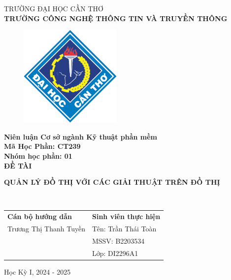 \begin{titlepage}
  \begin{center}
    \vspace{-6pt}TRƯỜNG ĐẠI HỌC CẦN THƠ \\
    \textbf{\fontsize{16pt}{0pt}\selectfont TRƯỜNG CÔNG NGHỆ THÔNG TIN VÀ TRUYỀN THÔNG}
    \begin{figure}[H]
      \centering
      \includegraphics[width=5cm]{assets/imgs/logo-ctu.png}
    \end{figure}
    \textbf{Niên luận Cơ sở ngành Kỹ thuật phần mềm} \\
    \textbf{Mã Học Phần: CT239} \\
    \textbf{Nhóm học phần: 01} \\
    \vspace{3cm}
    \textbf{\fontsize{16pt}{0pt}\selectfont ĐỀ TÀI} \\
    \vspace{0.5cm}
    \parbox{15cm}{\centering\textbf{\fontsize{14pt}{0pt}\selectfont QUẢN LÝ ĐỒ THỊ VỚI CÁC GIẢI THUẬT TRÊN ĐỒ THỊ  }} \\
    \vspace{3.5cm}
    \newcommand{\MyIndent}{\hspace{1cm}}
    \begin{tabular}{p{8cm} l}
      \textbf{Cán bộ hướng dẫn}        & \textbf{Sinh viên thực hiện}  \\
      \MyIndent Trương Thị Thanh Tuyền & \MyIndent Tên: Trần Thái Toàn \\
                                       & \MyIndent MSSV: B2203534      \\
                                       & \MyIndent Lớp: DI2296A1       \\
    \end{tabular}


    \vspace{1.5cm}
    \fontsize{14pt}{0pt}\selectfont Học Kỳ I, 2024 - 2025
  \end{center}
\end{titlepage}
\cleardoublepage
